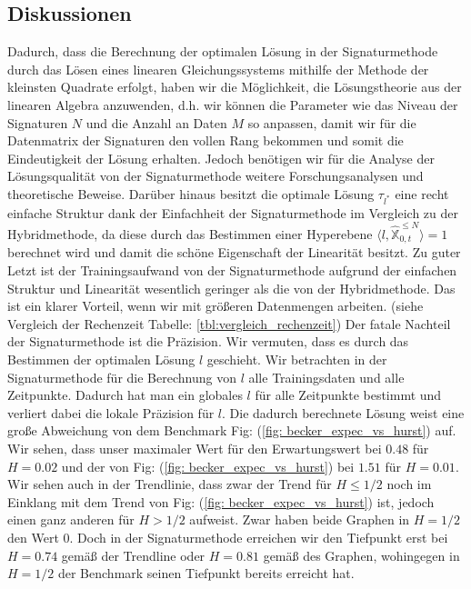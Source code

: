 \documentclass[12pt,titlepage,headsepline]{article}
\begin{document}
      \subsection{Diskussionen}
        Dadurch, dass die Berechnung der optimalen Lösung in der Signaturmethode durch das Lösen eines linearen Gleichungssystems mithilfe der Methode der kleinsten Quadrate erfolgt, haben wir die Möglichkeit, die Lösungstheorie aus der linearen Algebra anzuwenden, d.h. wir können die Parameter wie das Niveau der Signaturen $N$ und die Anzahl an Daten $M$ so anpassen, damit wir für die Datenmatrix der Signaturen den vollen Rang bekommen und somit die Eindeutigkeit der Lösung erhalten. Jedoch benötigen wir für die Analyse der Lösungsqualität von der Signaturmethode weitere Forschungsanalysen und theoretische Beweise. Darüber hinaus besitzt die optimale Lösung $\tau_{l^*}$ eine recht einfache Struktur dank der Einfachheit der Signaturmethode im Vergleich zu der Hybridmethode, da diese durch das Bestimmen einer Hyperebene $\langle l,\hat{\mathbb{X}}^{\leq N}_{0,t}\rangle = 1$ berechnet wird und damit die schöne Eigenschaft der Linearität besitzt. Zu guter Letzt ist der Trainingsaufwand von der Signaturmethode aufgrund der einfachen Struktur und Linearität wesentlich geringer als die von der Hybridmethode. Das ist ein klarer Vorteil, wenn wir mit größeren Datenmengen arbeiten. (siehe Vergleich der Rechenzeit Tabelle: \ref{tbl:vergleich_rechenzeit})
        \hfill\break
        Der fatale Nachteil der Signaturmethode ist die Präzision. Wir vermuten, dass es durch das Bestimmen der optimalen Lösung $l$ geschieht. Wir betrachten in der Signaturmethode für die Berechnung von $l$ alle Trainingsdaten und alle Zeitpunkte. Dadurch hat man ein globales $l$ für alle Zeitpunkte bestimmt und verliert dabei die lokale Präzision für $l$. Die dadurch berechnete Lösung weist eine große Abweichung von dem Benchmark Fig: (\ref{fig: becker_expec_vs_hurst}) auf. Wir sehen, dass unser maximaler Wert für den Erwartungswert bei $0.48$ für $H=0.02$ und der von Fig: (\ref{fig: becker_expec_vs_hurst}) bei $1.51$ für $H=0.01$. Wir sehen auch in der Trendlinie, dass zwar der Trend für
        $H\leq1/2$ noch im Einklang mit dem Trend von Fig: (\ref{fig: becker_expec_vs_hurst}) ist, jedoch einen ganz anderen für $H>1/2$ aufweist. Zwar haben beide Graphen in $H=1/2$ den Wert $0$. Doch in der Signaturmethode erreichen wir den Tiefpunkt erst bei $H=0.74$ gemäß der Trendline oder $H=0.81$ gemäß des Graphen, wohingegen in $H=1/2$ der Benchmark seinen Tiefpunkt bereits erreicht hat.
\end{document}
